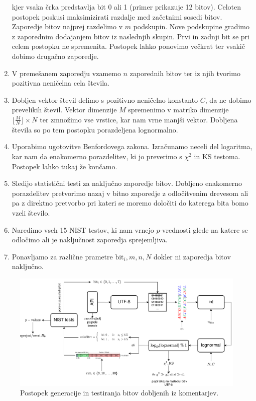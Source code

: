 \documentclass[11pt, oneside]{article}
\theoremstyle{definition}
\begin{document}
\begin{enumerate}
          kjer vsaka črka predstavlja bit 0 ali 1 (primer prikazuje 12 bitov).
          Celoten postopek poskusi maksimizirati razdalje med začetnimi sosedi bitov.
          Zaporedje bitov najprej razdelimo v $m$ podskupin. Nove podskupine gradimo z zaporednim dodajanjem bitov iz
          naslednjih skupin. Prvi in zadnji bit se pri celem postopku ne spremenita. Postopek lahko ponovimo večkrat ter
          vsakič dobimo drugačno zaporedje.
    \item V premešanem zaporedju vzamemo $n$ zaporednih bitov ter iz njih tvorimo pozitivna neničelna cela števila.
    \item Dobljen vektor števil delimo s pozitivno neničelno konstanto $C$, da ne dobimo prevelikih števil. Vektor dimenzije $M$ spremenimo
          v matriko dimenzije $\lfloor \frac{M}{N} \rfloor \times N$ ter zmnožimo vse vrstice, kar nam vrne manjši vektor.
          Dobljena števila so po tem postopku porazdeljena lognormalno.
    \item Uporabimo ugotovitve Benfordovega zakona. Izračunamo neceli del logaritma, kar nam da enakomerno
          porazdelitev, ki jo preverimo s $\chi^2$ in KS testoma. Postopek lahko tukaj že končamo.
    \item Sledijo statistični testi za naključno zaporedje bitov. Dobljeno enakomerno porazdelitev pretvorimo nazaj v bitno zaporedje z odločitvenim drevesom ali
          pa z direktno pretvorbo pri kateri se moremo določiti do katerega bita bomo vzeli število.
    \item Naredimo vseh 15 NIST testov, ki nam vrnejo $p$-vrednosti glede na katere se odločimo ali je naključnost
          zaporedja sprejemljiva.
    \item Ponavljamo za različne prametre $\text{bit}_i, m, n, N$ dokler ni zaporedja bitov naključno.
\end{enumerate}

\newpage

\begin{figure}[h!]
    \centering
    \includegraphics[width=1\textwidth]{text_rng_postopek.png}
    \caption{Postopek generacije in testiranja bitov dobljenih iz komentarjev.}
    \label{fig: text_rng}
\end{figure}
\end{document}
